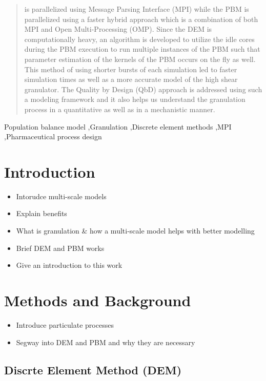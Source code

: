 \documentclass[preprint,11pt,authoryear]{elsarticle}
\begin{document}
\begin{frontmatter}
\begin{abstract}
is parallelized using Message Parsing Interface (MPI) while the PBM is parallelized using a faster
hybrid approach which is a combination of both MPI and Open Multi-Processing (OMP). Since
the DEM is computationally heavy, an algorithm is developed to utilize the idle cores during the
PBM execution to run multiple instances of the PBM such that parameter estimation of the kernels
of the PBM occurs on the fly as well. This method of using shorter bursts of each simulation led to
faster simulation times as well as a more accurate model of the high shear granulator. The Quality
by Design (QbD) approach is addressed using such a modeling framework and it also helps us
understand the granulation process in a quantitative as well as in a mechanistic manner. %
\end{abstract}
\begin{keyword}
Population balance model \sep Granulation \sep Discrete element methods  \sep MPI 
\sep Pharmaceutical process design
\end{keyword}
\end{frontmatter}
\section{Introduction}
\begin{itemize}
\item{Intorudce multi-scale models}
\item{Explain benefits}
\item{What is granulation \& how a multi-scale model helps with better modelling}
\item{Brief DEM and PBM works}
\item{Give an introduction to this work}
\end{itemize}

\section{Methods and Background}
\begin{itemize}
\item{Introduce particulate processes}
\item{Segway into DEM and PBM and why they are necessary}
\end{itemize}

\subsection{Discrte Element Method (DEM)}
\end{document}
